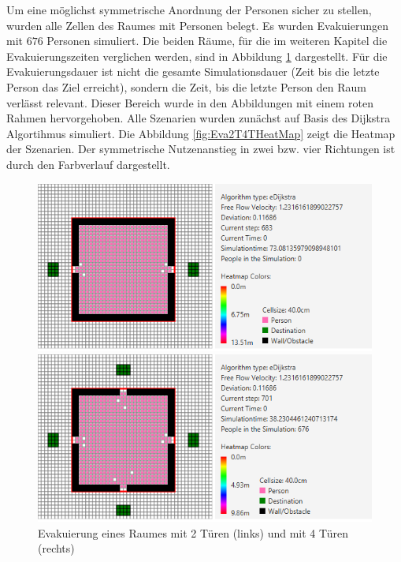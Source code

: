 Um eine möglichst symmetrische Anordnung der Personen sicher zu stellen, wurden alle Zellen des Raumes mit Personen belegt. Es wurden Evakuierungen mit $676$ Personen simuliert. Die beiden Räume, für die im weiteren Kapitel die Evakuierungszeiten verglichen werden, sind in Abbildung \ref{fig:Eva2T4TMap} dargestellt. Für die Evakuierungsdauer ist nicht die gesamte Simulationsdauer (Zeit bis die letzte Person das Ziel erreicht), sondern die Zeit, bis die letzte Person den Raum verlässt relevant. Dieser Bereich wurde in den Abbildungen mit einem roten Rahmen hervorgehoben. Alle Szenarien wurden zunächst auf Basis des Dijkstra Algortihmus simuliert. Die Abbildung \ref{fig:Eva2T4THeatMap} zeigt die Heatmap der Szenarien. Der symmetrische Nutzenanstieg in zwei bzw. vier Richtungen ist durch den Farbverlauf dargestellt. 

\begin{figure}[!htb]
	\centering
	\begin{minipage}{.5\textwidth}
		\centering
		\includegraphics[width=\textwidth]{abbildungen/Evak2TuerenAnfang.PNG}
		
	\end{minipage}%
	\begin{minipage}{0.5\textwidth}
		\centering
		\includegraphics[width=\textwidth]{abbildungen/Evak4TuerenAnfang.PNG}
	\end{minipage}
	\caption{Evakuierung eines Raumes mit 2 Türen (links) und mit 4 Türen (rechts)}
	\label{fig:Eva2T4TMap}
\end{figure}

